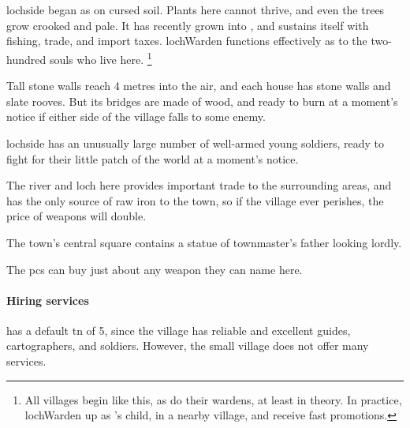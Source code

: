 

\section[\Glsfmttext{lochside}]{~~}
\label{lochside}

\begin{multicols}{2}

\begin{exampletext}
  \noindent
  \Gls{lochside} began as  on cursed soil.
  Plants here cannot thrive, and even the trees grow crooked and pale.
  It has recently grown into , and sustains itself with fishing, trade, and import taxes.
  \Gls{lochWarden} functions effectively as  to the two-hundred souls who live here.%
  \footnote{All \glspl{village} begin like this, as do their \glspl{warden}, at least in theory.
  In practice, \gls{lochWarden} up as 's child, in a nearby \gls{village}, and receive fast promotions.}
\end{exampletext}

Tall stone walls reach 4 metres into the air, and each house has stone walls and slate rooves.
But its bridges are made of wood, and ready to burn at a moment's notice if either side of the \gls{village} falls to some enemy.

\Gls{lochside} has an unusually large number of well-armed young soldiers, ready to fight for their little patch of the world at a moment's notice.

The river and loch here provides important trade to the surrounding areas, and has the only source of raw iron to the town, so if the \gls{village} ever perishes, the price of weapons will double.


The town's central square contains a statue of \gls{townmaster}'s father looking lordly.


The \glspl{pc} can buy just about any weapon they can name here.

\paragraph{Hiring services}
has a default \gls{tn} of 5, since the \gls{village} has reliable and excellent guides, cartographers, and soldiers.
However, the small \gls{village} does not offer many services.


\end{multicols}
